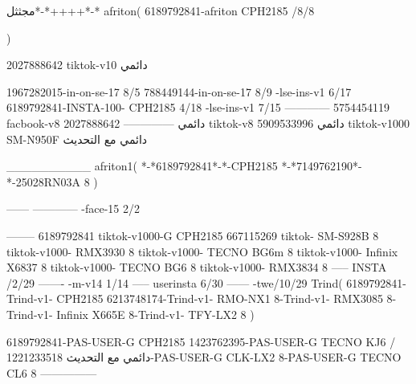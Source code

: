 مجثثل*-*++++*-*
afriton(
6189792841-afriton CPH2185  /8/8

)

2027888642 tiktok-v10
دائمي

1967282015-in-on-se-17 8/5
788449144-in-on-se-17 8/9
-lse-ins-v1 6/17
6189792841-INSTA-100- CPH2185 4/18
-lse-ins-v1 7/15
------------
5754454119 facbook-v8
دائمي
--------------
2027888642 tiktok-v8
دائمي
5909533996 tiktok-v1000  SM-N950F
دائمي مع التحديث

__________
afriton1(
*-*6189792841*-*-CPH2185
*-*7149762190*-*-25028RN03A  8
)


------
------------
-face-15 2/2

--------
6189792841 tiktok-v1000-G CPH2185 
667115269 tiktok- SM-S928B  8 tiktok-v1000- RMX3930  8 tiktok-v1000- TECNO BG6m  8 tiktok-v1000- Infinix X6837  8 tiktok-v1000- TECNO BG6  8 tiktok-v1000- RMX3834  8\9
-----
 INSTA /2/29
-------
-m-v14 1/14
-----
userinsta 6/30
------
-twe/10/29
Trind(
6189792841-Trind-v1- CPH2185 
6213748174-Trind-v1-  RMO-NX1  8-Trind-v1-  RMX3085  8-Trind-v1-  Infinix X665E  8-Trind-v1-  TFY-LX2  8\6
)


6189792841-PAS-USER-G CPH2185 
1423762395-PAS-USER-G TECNO KJ6  /دائمي مع التحديث
1221233518-PAS-USER-G CLK-LX2 8-PAS-USER-G TECNO CL6 8\8
    ---------------
